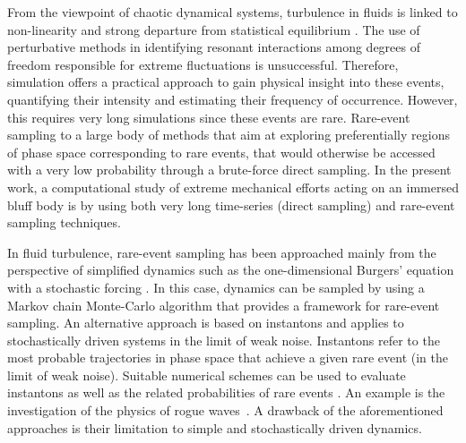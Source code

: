 \documentclass{jfm}
\newcommand{\EL}[1]{{\color{myred}{#1}}}
\begin{document}
From the viewpoint of chaotic dynamical systems, turbulence in fluids is linked to non-linearity and strong departure from statistical equilibrium \citep{KRAICHNAN}.
The use of perturbative methods in identifying resonant interactions among degrees of freedom responsible for extreme fluctuations is unsuccessful.
Therefore, simulation offers a practical approach to gain physical insight into these events, quantifying their intensity and estimating their frequency of occurrence.
However, this requires very long simulations since these events are rare.
% 
{Rare-event sampling \EL{refers} to a large body of methods that aim at exploring preferentially regions of phase space corresponding to rare events, that would otherwise be accessed with a very low probability through a brute-force direct sampling.}
% 
In the present work, a computational study of extreme mechanical efforts acting on an immersed bluff body is \EL{conducted} by using both very long time-series (direct sampling) and rare-event sampling techniques.
% 

% 
In fluid turbulence, rare-event sampling has been approached mainly from the perspective of simplified dynamics such as the one-dimensional Burgers' equation with a stochastic forcing \citep{bec_burgers_2007}. In this case, dynamics can be sampled by using a Markov chain Monte-Carlo algorithm \citep{duben_monte_2008,mesterhazy2011anomalous,mesterhazy2013lattice} that provides a framework for rare-event sampling.
% 
An alternative approach is based on instantons \citep{gurarie_instantons_1996,grafke2015instanton} and applies to stochastically driven systems in the limit of weak noise.
Instantons refer to the most probable trajectories in phase space that achieve a given rare event (in the limit of weak noise). Suitable numerical schemes can be used to evaluate instantons as well as the related probabilities of rare events \citep{chernykh_large_2001,grafke_instanton_2013,grigorio_instantons_2017,laurie2015computation,bouchet2014langevin}.
An example is the investigation of the physics of rogue waves~\citep{dematteis2018rogue,dematteis2019experimental}.
% 
A drawback of the aforementioned approaches is their limitation to simple and stochastically driven dynamics.
% 
\end{document}

